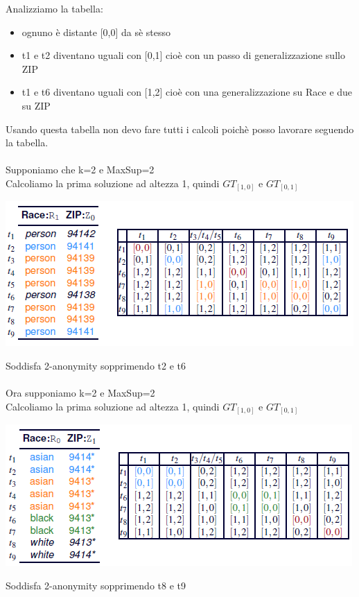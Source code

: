 Analizziamo la tabella:
\begin{itemize}
    \item ognuno è distante [0,0] da sè stesso
    \item t1 e t2 diventano uguali con [0,1] cioè con un passo di generalizzazione sullo ZIP
    \item t1 e t6 diventano uguali con [1,2] cioè con una generalizzazione su Race e due su ZIP
\end{itemize}
Usando questa tabella non devo fare tutti i calcoli poichè posso lavorare seguendo la tabella.\\\\
Supponiamo che k=2 e MaxSup=2\\
Calcoliamo la prima soluzione ad altezza 1, quindi \textbf{\(GT_{[1,0]}\)} e \(GT_{[0,1]}\)
\begin{center}
    \includegraphics[scale=0.6]{img/dvmatrix2.png}
\end{center}
Soddisfa 2-anonymity sopprimendo t2 e t6\\\\
Ora supponiamo k=2 e MaxSup=2\\
Calcoliamo la prima soluzione ad altezza 1, quindi \(GT_{[1,0]}\) e \textbf{\(GT_{[0,1]}\)}
\begin{center}
    \includegraphics[scale=0.6]{img/dvmatrix3.png}
\end{center}
Soddisfa 2-anonymity sopprimendo t8 e t9\\\\

